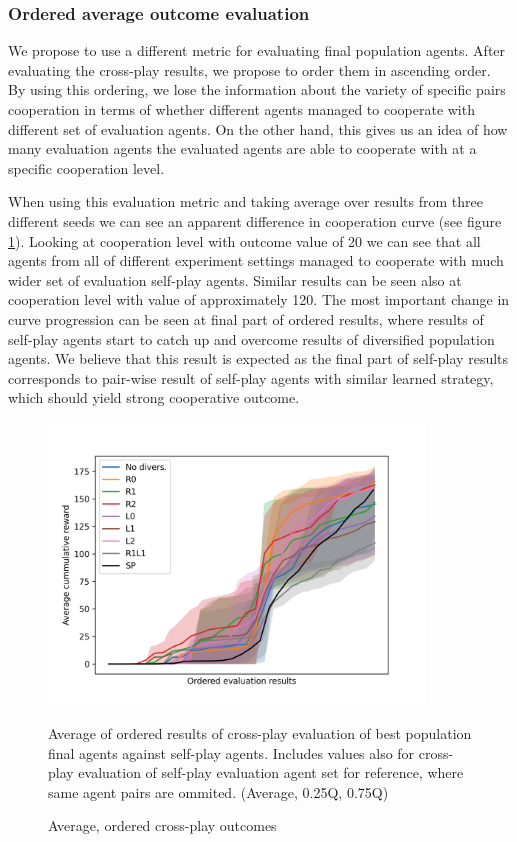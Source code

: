 \subsubsection{Ordered average outcome evaluation}
We propose to use a different metric for evaluating final population agents.
After evaluating the cross-play results, we propose to order them in ascending order.
By using this ordering, we lose the information about the variety of specific pairs cooperation in terms of whether different agents managed to cooperate with different set of evaluation agents.
On the other hand, this gives us an idea of how many evaluation agents the evaluated agents are able to cooperate with at a specific cooperation level.

When using this evaluation metric and taking average over results from three different seeds we can see an apparent difference in cooperation curve (see figure \ref{SimpleCNNOrderedAvg}).
Looking at cooperation level with outcome value of 20 we can see that all agents from all of different experiment settings managed to cooperate with much wider set of evaluation self-play agents.
Similar results can be seen also at cooperation level with value of approximately 120.
The most important change in curve progression can be seen at final part of ordered results, where results of self-play agents start to catch up and overcome results of diversified population agents.
We believe that this result is expected as the final part of self-play results corresponds to pair-wise result of self-play agents with similar learned strategy, which should yield strong cooperative outcome.

\begin{figure}[!ht]
    \centering
    \includegraphics*[width=10cm]{../img/SimpleCNNOrderedAvg.png}

    \caption{Average, ordered cross-play outcomes}
    \label{SimpleCNNOrderedAvg}
    \medskip
    \small 
    Average of ordered results of cross-play evaluation of best population final agents against self-play agents.
    Includes values also for cross-play evaluation of self-play evaluation agent set for reference, where same agent pairs are ommited.
    (Average, 0.25Q, 0.75Q)

\end{figure}

